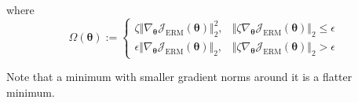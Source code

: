 \documentclass[landscape,a0paper,fontscale=0.3]{baposter}
\begin{document}
\begin{poster}
{where
\vspace{-1em}
\begin{equation*}
\Omega(\boldsymbol{\theta}):=\begin{cases}
\zeta\Vert\nabla_{\boldsymbol{\theta}}\mathcal{J}_\mathrm{ERM}(\boldsymbol{\theta})\Vert_2^2,&\!\!\!\!\Vert\zeta\nabla_{\boldsymbol{\theta}}\mathcal{J}_\mathrm{ERM}(\boldsymbol{\theta})\Vert_2\le\epsilon\\
\epsilon\Vert\nabla_{\boldsymbol{\theta}}\mathcal{J}_\mathrm{ERM}(\boldsymbol{\theta})\Vert_2,&\!\!\!\!\Vert\zeta\nabla_{\boldsymbol{\theta}}\mathcal{J}_\mathrm{ERM}(\boldsymbol{\theta})\Vert_2>\epsilon
\end{cases}
\end{equation*}
\vspace{-1.5em}

Note that a minimum with smaller gradient norms around it is a flatter minimum.
}

\end{poster}
\end{document}

